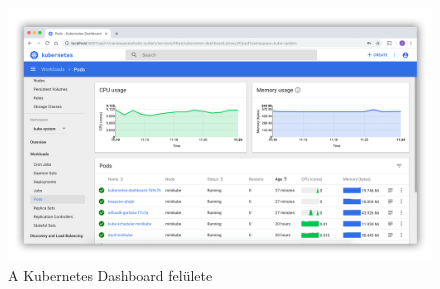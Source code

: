 \begin{figure}[!ht]
    \centering
    \includegraphics[width=150mm, keepaspectratio]{figures/kubernetes-dashboard.png}
    \caption{A Kubernetes Dashboard felülete}
    \label{fig:kibana}
\end{figure}